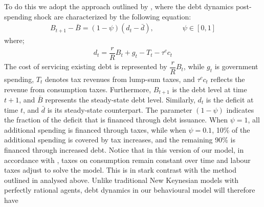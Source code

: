 \documentclass[11pt]{article}
\newcommand{\bb}{\bigbreak\noindent}
\begin{document}
\begin{spacing}{2}
\bb
To do this we adopt the approach outlined by \cite{uhlig2010some}, where the debt dynamics post-spending shock are characterized by the following equation:
\begin{align}
	B_{t+1} - \bar{B} = (1-\psi)(d_t - \bar{d}), \qquad\qquad \psi \in [0,1]
\end{align}
where;
\begin{align*}
	d_t = \dfrac{r}{R}B_t + g_t - T_t - \tau^c c_t
\end{align*} 
The cost of servicing existing debt is represented by \( \dfrac{r}{R}B_t \), while \( g_t \) is government spending, \( T_t \) denotes tax revenues from lump-sum taxes, and \( \tau^c c_t \) reflects the revenue from consumption taxes. Furthermore, \( B_{t+1} \) is the debt level at time \( t+1 \), and \( \bar{B} \) represents the steady-state debt level. Similarly, \( d_t \) is the deficit at time \( t \), and \( \bar{d} \) is its steady-state counterpart. The parameter \( (1-\psi) \) indicates the fraction of the deficit that is financed through debt issuance. When \( \psi = 1 \), all additional spending is financed through taxes, while when \( \psi = 0.1 \), 10\% of the additional spending is covered by tax increases, and the remaining 90\% is financed through increased debt.
\bb
Notice that in this version of our model, in accordance with \cite{uhlig2010some}, taxes on consumption remain constant over time and labour taxes adjust to solve the model. This is in stark contrast with the method outlined in \cite{correia2013unconventional} analysed above. 
\bb
Unlike traditional New Keynesian models with perfectly rational agents, debt dynamics in our behavioural model will therefore have 

 


\end{spacing}
\end{document}
